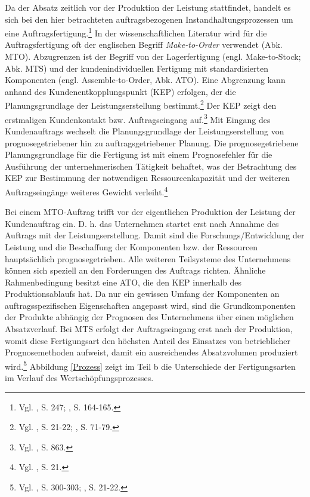 Da der Absatz zeitlich vor der Produktion der Leistung stattfindet, handelt es sich bei den hier betrachteten auftragsbezogenen Instandhaltungsprozessen um eine Auftragsfertigung.\footnote{Vgl. \cite{hax1956industriebetrieb}, S. 247; \cite{Gutenberg1965dispos}, S. 164-165.} In der wissenschaftlichen Literatur wird für die Auftragsfertigung oft der englischen Begriff \textit{Make-to-Order} verwendet (Abk. MTO). Abzugrenzen ist der Begriff von der Lagerfertigung (engl. Make-to-Stock; Abk. MTS) und der kundenindividuellen Fertigung mit standardisierten Komponenten (engl. Assemble-to-Order, Abk. ATO). 
Eine Abgrenzung kann anhand des Kundenentkopplungspunkt (KEP) erfolgen, der die Planungsgrundlage der Leistungserstellung bestimmt.\footnote{Vgl. \cite{quante2009management}, S. 21-22; \cite{sharman1984rediscovery}, S. 71-79.} Der KEP zeigt den erstmaligen Kundenkontakt bzw. Auftragseingang auf.\footnote{Vgl. \cite{Olhager2010863}, S. 863.} Mit Eingang des Kundenauftrags wechselt die Planungsgrundlage der Leistungserstellung von prognosegetriebener hin zu auftragsgetriebener Planung. Die prognosegetriebene Planungsgrundlage für die Fertigung ist mit einem Prognosefehler für die Ausführung der unternehmerischen Tätigkeit behaftet, was der Betrachtung des KEP zur Bestimmung der notwendigen Ressourcenkapazität und der weiteren Auftragseingänge weiteres Gewicht verleiht.\footnote{Vgl. \cite{quante2009management}, S. 21.} 

Bei einem MTO-Auftrag trifft vor der eigentlichen Produktion der Leistung der Kundenauftrag ein. D. h. das Unternehmen startet erst nach Annahme des Auftrags mit der Leistungserstellung. Damit sind die Forschungs/Entwicklung der Leistung und die Beschaffung der Komponenten bzw. der Ressourcen hauptsächlich prognosegetrieben. Alle weiteren Teilsysteme des Unternehmens können sich speziell an den Forderungen des Auftrags richten. Ähnliche Rahmenbedingung besitzt eine ATO, die den KEP innerhalb des Produktionsablaufs hat. Da nur ein gewissen Umfang der Komponenten an auftragsspezifischen Eigenschaften angepasst wird, sind die Grundkomponenten der Produkte abhängig der Prognosen des Unternehmens über einen möglichen Absatzverlauf. Bei MTS erfolgt der Auftragseingang erst nach der Produktion, womit diese Fertigungsart den höchsten Anteil des Einsatzes von betrieblicher Prognosemethoden aufweist, damit ein ausreichendes Absatzvolumen produziert wird.\footnote{Vgl. \cite{fleischmeyr2004codp}, S. 300-303; \cite{quante2009management}, S. 21-22.} Abbildung \ref{Prozess} zeigt im Teil b die Unterschiede der Fertigungsarten im Verlauf des Wertschöpfungsprozesses. 

